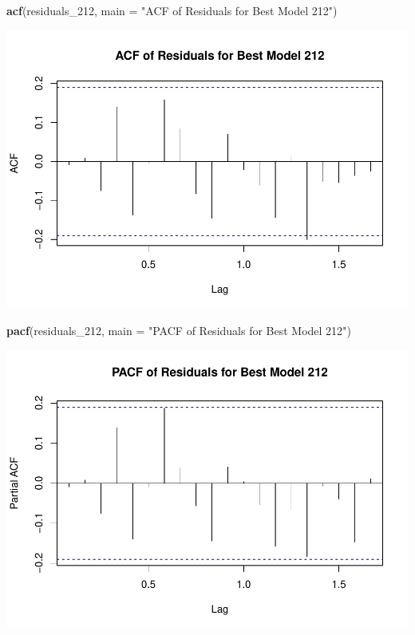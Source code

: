 \documentclass[
]{book}
\newenvironment{Shaded}{\begin{snugshade}}{\end{snugshade}}
\newcommand{\AttributeTok}[1]{\textcolor[rgb]{0.13,0.29,0.53}{#1}}
\newcommand{\FunctionTok}[1]{\textcolor[rgb]{0.13,0.29,0.53}{\textbf{#1}}}
\newcommand{\NormalTok}[1]{#1}
\newcommand{\StringTok}[1]{\textcolor[rgb]{0.31,0.60,0.02}{#1}}
\begin{document}
\begin{Shaded}
\begin{Highlighting}[]
\FunctionTok{acf}\NormalTok{(residuals\_212, }\AttributeTok{main =} \StringTok{"ACF of Residuals for Best Model 212"}\NormalTok{)}
\end{Highlighting}
\end{Shaded}

\includegraphics{bookdown-demo_files/figure-latex/unnamed-chunk-50-3.pdf}

\begin{Shaded}
\begin{Highlighting}[]
\FunctionTok{pacf}\NormalTok{(residuals\_212, }\AttributeTok{main =} \StringTok{"PACF of Residuals for Best Model 212"}\NormalTok{)}
\end{Highlighting}
\end{Shaded}

\includegraphics{bookdown-demo_files/figure-latex/unnamed-chunk-50-4.pdf}
\end{document}
